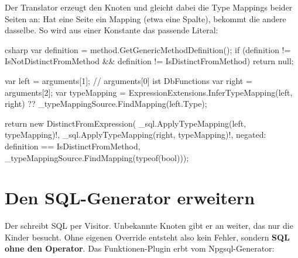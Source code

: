 Der Translator erzeugt den Knoten und gleicht dabei die Type Mappings beider Seiten an: Hat
eine Seite ein Mapping (etwa eine Spalte), bekommt die andere dasselbe. So wird aus einer
Konstante das passende Literal:

\begin{sourcecode}{csharp}
var definition = method.GetGenericMethodDefinition();
if (definition != IsNotDistinctFromMethod && definition != IsDistinctFromMethod)
    return null;

var left = arguments[1];                        // arguments[0] ist DbFunctions
var right = arguments[2];
var typeMapping = ExpressionExtensions.InferTypeMapping(left, right)
                  ?? _typeMappingSource.FindMapping(left.Type);

return new DistinctFromExpression(
    _sql.ApplyTypeMapping(left, typeMapping)!,
    _sql.ApplyTypeMapping(right, typeMapping)!,
    negated: definition == IsDistinctFromMethod,
    _typeMappingSource.FindMapping(typeof(bool)));
\end{sourcecode}

\section{Den SQL-Generator erweitern}

Der  schreibt SQL per Visitor. Unbekannte
Knoten gibt er an
 weiter, das
nur die Kinder besucht. Ohne eigenen Override entsteht also kein Fehler, sondern \textbf{SQL
ohne den Operator}. Das Funktionen-Plugin erbt vom Npgsql-Generator:

